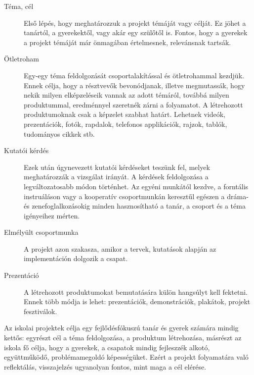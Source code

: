 \begin{description}
      \item[Téma, cél] Első lépés, hogy meghatározzuk a projekt témáját vagy
            célját. Ez jöhet a tanártól, a gyerekektől, vagy akár egy szülőtől
            is.
            Fontos,
            hogy a gyerekek a projekt témáját már önmagában értelmesnek,
            relevánsnak
            tartsák.

      \item [Ötletroham]  Egy-egy téma feldolgozását csoportalakítással és
            ötletrohammal kezdjük. Ennek célja, hogy a résztvevők bevonódjanak,
            illetve
            megmutassák, hogy nekik milyen elképzeléseik vannak az adott
            témáról,
            továbbá
            milyen produktummal, eredménnyel szeretnék zárni a folyamatot. A
            létrehozott
            produktumoknak csak a képzelet szabhat határt. Lehetnek videók,
            prezentációk,
            fotók, rapdalok, telefonos applikációk, rajzok, tablók, tudományos
            cikkek stb.

      \item [Kutatói kérdés] Ezek után úgynevezett kutatói kérdéseket teszünk
            fel,
            melyek meghatározzák a vizsgálat irányát. A kérdések feldolgozása a
            legváltozatosabb módon történhet. Az egyéni munkától kezdve, a
            forntális
            instruáláson vagy a kooperatív csoportmunkán keresztűl egészen a
            dráma-
            és
            zenefoglalkozásokig minden hasznosítható a tanár, a csoport és a
            téma
            igényeihez mérten.
      \item [Elmélyült csoportmunka] A projekt azon szakasza, amikor a tervek,
            kutatások alapján az implementáción dolgozik a csapat.
      \item [Prezentáció] A létrehozott produktumokat bemutatására külön
            hangsúlyt
            kell fektetni. Ennek több módja is lehet: prezentációk,
            demonstrációk,
            plakátok, projekt fesztiválok.
\end{description}

Az iskolai projektek célja egy fejlődésfókuszú tanár és gyerek számára mindig
kettős: egyrészt cél a téma feldolgozása, a produktum létrehozása, másrészt az
iskola fő célja, hogy a gyerekek, a csapatok mindig fejleszzék alkotó,
együttműködő, problémamegoldó képességüket. Ezért a projekt folyamatára való
reflektálás, visszajelzés ugyanolyan fontos, mint maga a cél elérése.

